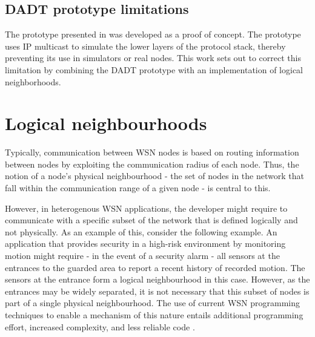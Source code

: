 \subsection {DADT prototype limitations}

The prototype presented in \cite{migliavacca_DADT:2006} was developed as a proof of 
concept. The prototype uses IP multicast to simulate the lower layers of the 
protocol stack, thereby preventing its use in simulators or real nodes. This 
work sets out to correct this limitation by combining the DADT prototype with 
an implementation of logical neighborhoods. %

\section {Logical neighbourhoods} \label{LNDescription}

Typically, communication between WSN nodes is based on routing 
information between nodes by exploiting the communication radius of each node.
Thus, the notion of a node's physical neighbourhood - the set of nodes in the
network
that fall within the communication range of a given node - is central to this.

However, in heterogenous WSN applications, the developer might require to
communicate with a specific subset of the network that is defined logically and
not physically. As an example of this, consider the following example. An
application that provides security in a high-risk environment by monitoring 
motion might require - in the event of a security alarm - all sensors at the
entrances to the guarded area to report a recent history of recorded motion.
The sensors at the entrance form a logical neighbourhood in this case. However,
as the entrances may be widely separated, it is not necessary that this subset
of nodes is part of a single physical neighbourhood. The use of current WSN
programming techniques to enable a mechanism of this nature entails additional
programming effort, increased complexity, and less reliable code
\cite{mottola_LN:2006}.  


